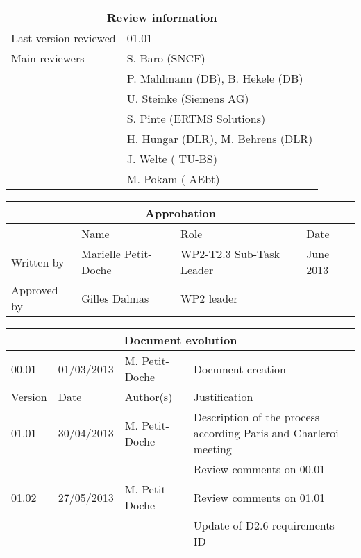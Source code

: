 \documentclass{template/openetcs_article}
\begin{document}
\begin{tabular}{|p{4.4cm}|p{8.7cm}|}
\hline
\multicolumn{2}{|c|}{Review information} \\
\hline
Last version reviewed & 01.01 \\
\hline
Main reviewers & S. Baro (SNCF) \\
& P. Mahlmann (DB), B. Hekele (DB)\\
& U. Steinke (Siemens AG) \\
& S. Pinte (ERTMS Solutions) \\
& H. Hungar (DLR), M. Behrens (DLR) \\
& J. Welte ( TU-BS) \\
& M. Pokam ( AEbt) \\
\hline
\end{tabular}

\begin{tabular}{|p{2.2cm}|p{4cm}|p{4cm}|p{2cm}|}
\hline
\multicolumn{4}{|c|}{Approbation} \\
\hline
  &  Name & Role & Date   \\
\hline  
Written by    &  Marielle Petit-Doche & WP2-T2.3 Sub-Task Leader  &  June 2013\\
\hline
Approved by & Gilles Dalmas & WP2 leader & \\
\hline
\end{tabular}

\begin{tabular}{|p{2.2cm}|p{2cm}|p{3cm}|p{5cm}|}
\hline
\multicolumn{4}{|c|}{Document evolution} \\
\hline
00.01 & 01/03/2013 & M. Petit-Doche &  Document creation  \\
Version &  Date & Author(s) & Justification  \\
\hline  
01.01 & 30/04/2013 & M. Petit-Doche &  Description of the process according Paris and Charleroi meeting  \\
& & & Review comments on 00.01 \\
\hline  
01.02 & 27/05/2013 & M. Petit-Doche &  Review comments on 01.01 \\
& & & Update of D2.6 requirements ID \\
\hline  
\end{tabular}



\newcommand{\tbd}{\colorbox{cyan}{\%\%To Be Defined\%\%}}
\newcommand{\tbc}{\colorbox{cyan}{\%\%To Be Confirmed\%\%}}
\newcommand{\todo}[1]{\colorbox{cyan}{\%\%{#1}\%\%}}
\newlength{\origindent}
\end{document}
